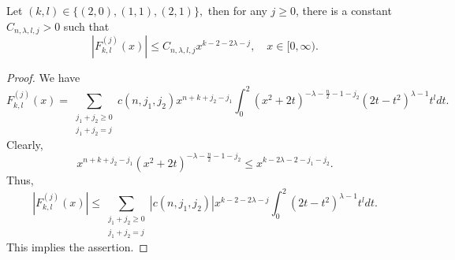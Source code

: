 \documentclass{amsart}
\begin{document}
\begin{lemma}\label{fourth fkl lemma} Let $(k,l)\in\{(2,0),(1,1),(2,1)\},$ then for any $j\geq0$, there is a constant $C_{n,\lambda,l,j}>0$ such that
$$|F_{k,l}^{(j)}(x)|\leq C_{n,\lambda,l,j}x^{k-2-2\lambda-j},\quad x\in [0,\infty).$$
\end{lemma}
\begin{proof} We have
$$F_{k,l}^{(j)}(x)=\sum_{\substack{j_1+j_2\geq0\\ j_1+j_2=j}}c(n,j_1,j_2)x^{n+k+j_2-j_1}\int_0^2(x^2+2t)^{-\lambda-\frac{n}{2}-1-j_2}(2t-t^2)^{\lambda-1}t^ldt.$$
Clearly,
$$x^{n+k+j_2-j_1}(x^2+2t)^{-\lambda-\frac{n}{2}-1-j_2}\leq x^{k-2\lambda-2-j_1-j_2}.$$
Thus,
$$|F_{k,l}^{(j)}(x)|\leq\sum_{\substack{j_1+j_2\geq0\\ j_1+j_2=j}}|c(n,j_1,j_2)|x^{k-2-2\lambda-j}\int_0^2(2t-t^2)^{\lambda-1}t^ldt.$$
This implies the assertion.
\end{proof}
\end{document}

